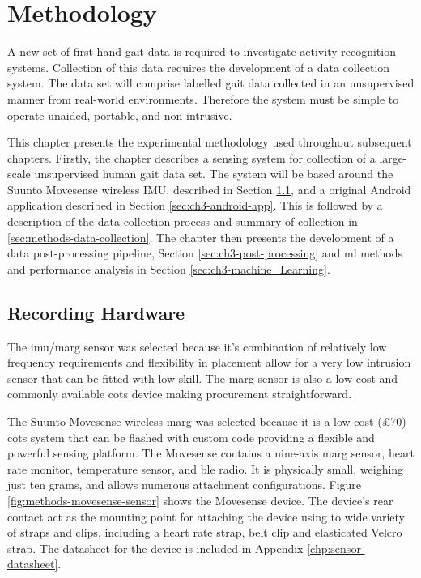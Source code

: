 \chapter{Methodology}
\label{chp:methods}
A new set of first-hand gait data is required to investigate activity recognition systems. Collection of this data requires the development of a data collection system. The data set will comprise labelled gait data collected in an unsupervised manner from real-world environments. Therefore the system must be simple to operate unaided, portable, and non-intrusive.

This chapter presents the experimental methodology used throughout subsequent chapters. Firstly, the chapter describes a sensing system for collection of a large-scale unsupervised human gait data set. The system will be based around the Suunto Movesense wireless IMU, described in Section \ref{sec:ch3-recording-hardware}, and a original Android application described in Section \ref{sec:ch3-android-app}. This is followed by a description of the data collection process and summary of collection in \ref{sec:methods-data-collection}. The chapter then presents the development of a data post-processing pipeline, Section \ref{sec:ch3-post-processing} and \acrfull{ml} methods and performance analysis in Section \ref{sec:ch3-machine_Learning}.

\section{Recording Hardware}
\label{sec:ch3-recording-hardware}
The \acrshort{imu}/\acrshort{marg} sensor was selected because it's combination of relatively low frequency requirements and flexibility in placement allow for a very low intrusion sensor that can be fitted with low skill. The \acrshort{marg} sensor is also a low-cost and commonly available \acrfull{cots} device making procurement straightforward.

The Suunto Movesense wireless \acrshort{marg} was selected because it is a low-cost (£70) \acrshort{cots} system that can be flashed with custom code providing a flexible and powerful sensing platform. The Movesense contains a nine-axis \acrshort{marg} sensor, heart rate monitor, temperature sensor, and \acrshort{ble} radio. It is physically small, weighing just ten grams, and allows numerous attachment configurations. Figure \ref{fig:methods-movesense-sensor} shows the Movesense device. The device's rear contact act as the mounting point for attaching the device using to wide variety of straps and clips, including a heart rate strap, belt clip and elasticated Velcro strap. The datasheet for the device is included in Appendix \ref{chp:sensor-datasheet}.

